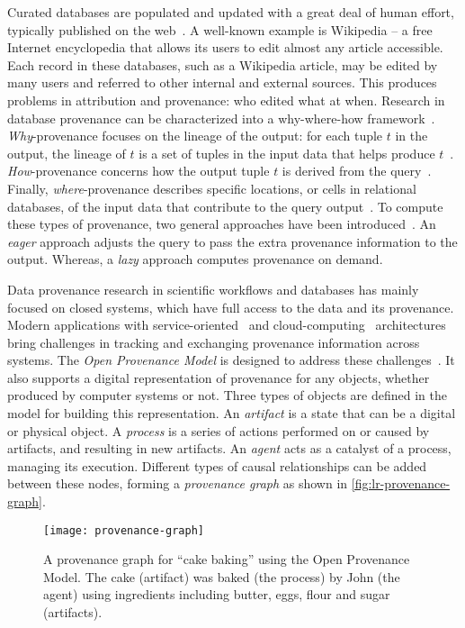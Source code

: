 Curated databases are populated and updated with a great deal of human effort, typically published on the web~\cite{Buneman2008}. A well-known example is Wikipedia -- a free Internet encyclopedia that allows its users to edit almost any article accessible. Each record in these databases, such as a Wikipedia article, may be edited by many users and referred to other internal and external sources. This produces problems in attribution and provenance: who edited what at when. Research in database provenance can be characterized into a why-where-how framework~\cite{Cheney2007}. \emph{Why}-provenance focuses on the lineage of the output: for each tuple $t$ in the output, the lineage of $t$ is a set of tuples in the input data that helps produce $t$~\cite{Cui2000}. \emph{How}-provenance concerns how the output tuple $t$ is derived from the query~\cite{Green2007}. Finally, \emph{where}-provenance describes specific locations, or cells in relational databases, of the input data that contribute to the query output~\cite{Buneman2001}. To compute these types of provenance, two general approaches have been introduced~\cite{Buneman2008}. An \emph{eager} approach adjusts the query to pass the extra provenance information to the output. Whereas, a \emph{lazy} approach computes provenance on demand.

Data provenance research in scientific workflows and databases has mainly focused on closed systems, which have full access to the data and its provenance. Modern applications with service-oriented~\cite{Papazoglou2007} and cloud-computing~\cite{Buyya2009} architectures bring challenges in tracking and exchanging provenance information across systems. The \emph{Open Provenance Model} is designed to address these challenges~\cite{Moreau2011}. It also supports a digital representation of provenance for any objects, whether produced by computer systems or not. Three types of objects are defined in the model for building this representation. An \emph{artifact} is a state that can be a digital or physical object. A \emph{process} is a series of actions performed on or caused by artifacts, and resulting in new artifacts. An \emph{agent} acts as a catalyst of a process, managing its execution. Different types of causal relationships can be added between these nodes, forming a \emph{provenance graph} as shown in \autoref{fig:lr-provenance-graph}.

\begin{figure}[!htb]
	\centering
	\texttt{[image: provenance-graph]}
	\caption{A provenance graph for ``cake baking'' using the Open Provenance Model. The cake (artifact) was baked (the process) by John (the agent) using ingredients including butter, eggs, flour and sugar (artifacts). }
	\label{fig:lr-provenance-graph}
\end{figure}

